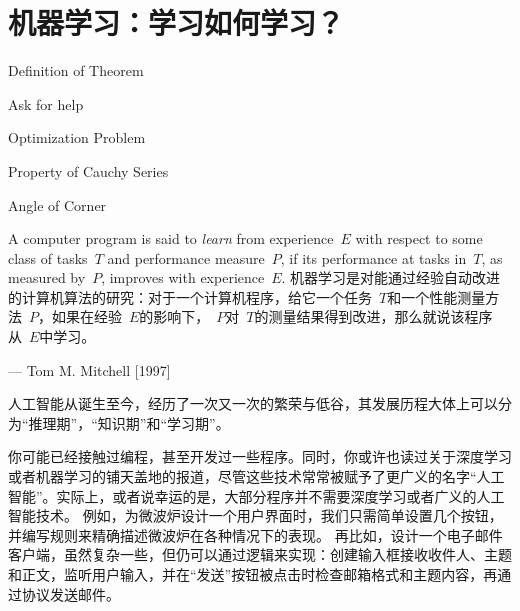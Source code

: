 \chapter{机器学习：学习如何学习？}
 \begin{introduction}
  \item Definition of Theorem
  \item Ask for help
  \item Optimization Problem
  \item Property of Cauchy Series
  \item Angle of Corner
\end{introduction}

A computer program is said to {\em learn} from experience~$ E$ with respect to some class of tasks~$T$ and performance measure~$P$, if its performance at tasks in~$T$, as measured by~$P$, improves with experience~$E$.
机器学习是对能通过经验自动改进的计算机算法的研究：对于一个计算机程序，给它一个任务~$T$和一个性能测量方法~$P$，如果在经验~$E$的影响下，~$P$对~$T$的测量结果得到改进，那么就说该程序从~$E$中学习。
\begin{flushright}
— Tom M. Mitchell  [1997]
\end{flushright}

人工智能从诞生至今，经历了一次又一次的繁荣与低谷，其发展历程大体上可以分为“推理期”，“知识期”和“学习期”\cite{周志华, 2016]}。

%
%
%

你可能已经接触过编程，甚至开发过一些程序。同时，你或许也读过关于深度学习或者机器学习的铺天盖地的报道，尽管这些技术常常被赋予了更广义的名字“人工智能”。实际上，或者说幸运的是，大部分程序并不需要深度学习或者广义的人工智能技术。
例如，为微波炉设计一个用户界面时，我们只需简单设置几个按钮，并编写规则来精确描述微波炉在各种情况下的表现。
再比如，设计一个电子邮件客户端，虽然复杂一些，但仍可以通过逻辑来实现：创建输入框接收收件人、主题和正文，监听用户输入，并在“发送”按钮被点击时检查邮箱格式和主题内容，再通过协议发送邮件。

